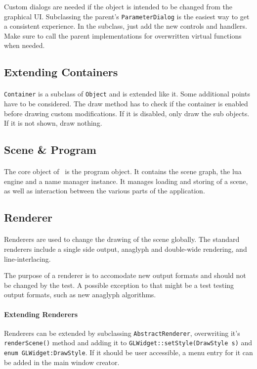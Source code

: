Custom dialogs are needed if the object is intended to be changed from the graphical UI.
Subclassing the parent's \lstinline{ParameterDialog} is the easiest way to get a consistent experience.
In the subclass, just add the new controls and handlers.
Make sure to call the parent implementations for overwritten virtual functions when needed.


\subsection{Extending Containers}
\paragraph{}
\lstinline{Container} is a subclass of \lstinline{Object} and is extended like it.
Some additional points have to be considered.
The draw method has to check if the container is enabled before drawing custom modifications.
If it is disabled, only draw the sub objects.
If it is not shown, draw nothing.


\subsection{Scene \& Program}
\paragraph{}
The core object of \ER\ is the program object.
It contains the scene graph, the lua engine and a name manager instance.
It manages loading and storing of a scene, as well as interaction between the various parts of the application.


\subsection{Renderer}
\paragraph{}
Renderers are used to change the drawing of the scene globally.
The standard renderers include a single side output, anaglyph and double-wide rendering, and line-interlacing.

The purpose of a renderer is to accomodate new output formats and should not be changed by the test.
A possible exception to that might be a test testing output formats, such as new anaglyph algorithms.

\paragraph{Extending Renderers}
Renderers can be extended by subclassing \lstinline{AbstractRenderer}, overwriting it's \lstinline{renderScene()} method and adding it to \lstinline{GLWidget::setStyle(DrawStyle s)} and \lstinline{enum GLWidget:DrawStyle}.
If it should be user accessible, a menu entry for it can be added in the main window creator.


